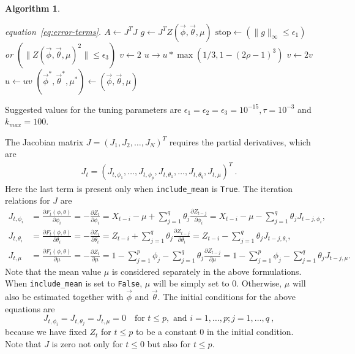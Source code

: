 \documentclass[english,12pt]{article}
\theoremstyle{algorithm}
\newtheorem{algorithm}{Algorithm}[section]
\begin{document}
\begin{algorithm}
\begin{algorithmic}[1]
                    equation~\ref{eq:error-terms}.
					\State $A \leftarrow J^T J$
					\State $g \leftarrow J^T Z(\vec{\phi},\vec{\theta},\mu)$
					\State $ \text{stop} \leftarrow (\|g\|_{\infty} \le \epsilon_1)$ or $(\| Z(\vec{\phi},\vec{\theta},\mu)^2 \| \le \epsilon_3)$  
					\State $v \leftarrow 2$
					\State $u \rightarrow u * \max(1/3, 1 - (2\rho - 1)^3 )$
				\Else  {}
					\State $v \leftarrow 2 v$
					\State $u \leftarrow u v$
				\EndIf
			\EndIf
	\EndWhile
	\State $(\vec{\phi}^*,\vec{\theta}^*,\mu^*) \leftarrow (\vec{\phi},\vec{\theta},\mu)$
\end{algorithmic}
\label{alg:LM}
\end{algorithm}

Suggested values for the tuning parameters are $\epsilon_1 = \epsilon_2 =
\epsilon_3 = 10^{-15}, \tau = 10^{-3}$ and $k_{max} = 100$.

The Jacobian matrix $J = (J_{1}, J_{2}, \dots, J_N)^T$ requires the partial derivatives, which are
\begin{align}
J_t = (J_{t, \phi_1}, \dots, J_{t,\phi_p}, J_{t,\theta_1}, \dots,
J_{t,\theta_q}, J_{t,\mu})^T\ .
\end{align}
Here the last term is present only when \texttt{include\_mean} is
\texttt{True}.
The iteration relations for $J$ are
\begin{align}
J_{t, \phi_i} &= \frac{\partial F_t(\phi,\theta)}{\partial \phi_i} =
-\frac{\partial Z_t}{\partial \phi_i} = X_{t-i}-\mu + \sum_{j=1}^q
\theta_j \frac{\partial Z_{t - j}}{\partial \phi_i} = X_{t-i}-\mu - \sum_{j=1}^q
\theta_j J_{t-j,\phi_i}, \\
J_{t, \theta_i}&=\frac{\partial F_t(\phi,\theta)}{\partial \theta_i} =
-\frac{\partial Z_t}{\partial \theta_i} = Z_{t-i} + \sum_{j =1}^q
\theta_j \frac{\partial Z_{t - j}}{\partial \theta_i} = Z_{t-i} -
\sum_{j=1}^q \theta_j J_{t-j,\theta_i}, \\
J_{t, \mu} &=\frac{\partial F_t(\phi,\theta)}{\partial \mu} =
-\frac{\partial Z_t}{\partial \mu} = 1 -
\sum_{j=1}^p \phi_j - \sum_{j=1}^q \theta_j \frac{\partial
  Z_{t-j}}{\partial \mu} = 1 - \sum_{j=1}^p \phi_j - \sum_{j=1}^q
\theta_j J_{t-j,\mu}.
\end{align}
Note that the mean value $\mu$ is considered separately in the above
formulations. When \texttt{include\_mean} is set to \texttt{False}, $\mu$ will be simply
set to 0. Otherwise, $\mu$ will also be estimated together with
$\vec{\phi}$ and $\vec{\theta}$. The initial conditions for the above
equations are
\begin{equation}
J_{t,\phi_i} = J_{t,\theta_j} = J_{t,\mu} = 0 \quad \mbox{for }
t \leq p, \mbox{ and } i=1,\dots,p; j = 1, \dots, q\ ,
\end{equation}
because we have fixed $Z_t$ for $t\leq p$ to be a constant $0$ in the initial
condition. Note that $J$ is zero not only for $t\leq
0$ but also for $t\leq p$.
\end{document}

